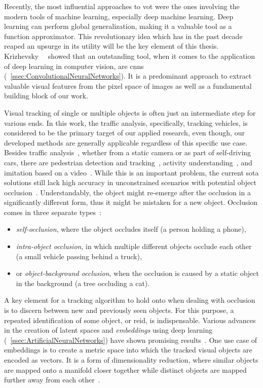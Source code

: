 Recently, the most influential approaches to \gls{vot} were the ones involving the modern tools of machine learning, especially deep machine learning. Deep learning can perform global generalization, making it a valuable tool as a function approximator. This revolutionary idea which has in the past decade reaped an upsurge in its utility will be the key element of this thesis. Krizhevsky~\etal{}~\cite{krizhevsky2012classification} showed that an outstanding tool, when it comes to the application of deep learning in computer vision, are \glspl{cnn} (\sectiontext{}~\ref{ssec:ConvolutionalNeuralNetworks}). It is a predominant approach to extract valuable visual features from the pixel space of images as well as a fundamental building block of our work.

Visual tracking of single or multiple objects is often just an intermediate step for various ends. In this work, the traffic analysis, specifically, tracking vehicles, is considered to be the primary target of our applied research, even though, our developed methods are generally applicable regardless of this specific use case. Besides traffic analysis~\cite{tang2019cityflow}, whether from a static camera or as part of self-driving cars, there are pedestrian detection and tracking~\cite{lealtaixe2017tracking}, activity understanding~\cite{finn2017oneshotimitation}, and imitation based on a video~\cite{peng2018sfv}. While this is an important problem, the current \gls{sota} solutions still lack high accuracy in unconstrained scenarios with potential object occlusion~\cite{jiyan2007robustocclusion}. Understandably, the object might re-emerge after the occlusion in a significantly different form, thus it might be mistaken for a new object. Occlusion comes in three separate types~\cite{gabriel2003sotamot}:
\begin{itemize}
    \item \emph{self-occlusion}, where the object occludes itself (a person holding a phone),
    \item \emph{intra-object occlusion}, in which multiple different objects occlude each other (a small vehicle passing behind a truck),
    \item or \emph{object-background occlusion}, when the occlusion is caused by a static object in the background (a tree occluding a cat).
\end{itemize}

A key element for a tracking algorithm to hold onto when dealing with occlusion is to discern between new and previously seen objects. For this purpose, a repeated identification of some object, or \gls{reid}, is indispensable. Various advances in the creation of latent spaces and \emph{embeddings} using deep learning (\sectiontext{}~\ref{ssec:ArtificialNeuralNetworks}) have shown promising results~\cite{schroff2015facenet, taigman2014deepface}. One use case of embeddings is to create a metric space into which the tracked visual objects are encoded as vectors. It is a form of dimensionality reduction, where similar objects are mapped onto a manifold closer together while distinct objects are mapped further away from each other~\cite{hadsell2006dimreduction}.

